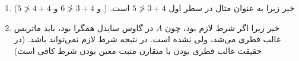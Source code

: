 {\begin{enumerate}
\begin{align*}
\begin{pmatrix}
        0 & \frac{3}{5} & \frac{4}{5} \\
        \frac{1}{2} & 0 & \frac{2}{3} \\
        \frac{4}{5} & \frac{4}{5} & 0
    \end{pmatrix} \xrightarrow{\text{مقادیر ویژه}}  (1.39054, -0.847394, -0.543141)
\end{align*}
بیشینه‌ی قدرمطلق‌شان 
$1.39054$
است که 
$1 < $
است. در نتیجه واگرا می‌شود.
\\
اما برای گاوس سایدل
$(L + D)^{-1} U$
را حساب می‌کنیم:
\begin{align*}
    \begin{pmatrix}
        0 & \frac{3}{5} & \frac{4}{5} \\
        0 & -\frac{3}{10} & \frac{4}{15} \\
        0 & -\frac{6}{25} & -\frac{64}{75}
    \end{pmatrix} \xrightarrow{\text{مقادیر ویژه}} (0,
    -0.688669, 
    -0.464665)
\end{align*}
که بیشینه‌ی قدرمطلق‌شان 
$1 > 0.688669$
است. که با همگرا بودن گاوس سایدل سازگار است.
\\
پس گاوس سایدل همگرا و ژاکوبی واگراست.
\item 
خیر زیرا به عنوان مثال در سطر اول
$5 \ngtr 3 + 4$
است.
(
و
$6 \ngtr 3 + 4$
و
$5 \ngtr 4 + 4$)
\item 
خیر زیرا اگر شرط لازم بود، چون 
$A$
در گاوس سایدل همگرا بود، باید ماتریس غالب قطری می‌شد، ولی نشده است. در نتیجه شرط لازم نمی‌تواند باشد. (در حقیقت غالب قطری بودن یا متقارن مثبت معین بودن شرط کافی است)
\end{enumerate}
}
